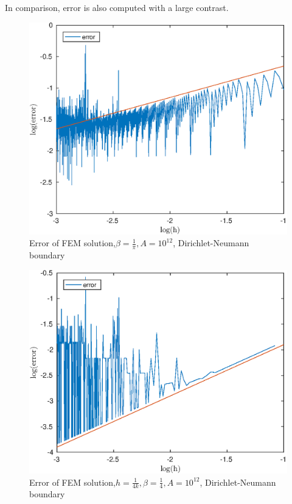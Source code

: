 \documentclass[12pt]{article}
\begin{document}
In comparison, error is also computed with a large contrast.
\begin{figure}[h!]
\centering
\includegraphics[scale=0.7]{error-pi-DN-12}
\caption{Error of FEM solution,$\beta=\frac{1}{\pi},A=10^{12}$, Dirichlet-Neumann boundary}
\label{fig-e-pi-DN}
\end{figure}
\pagebreak

\begin{figure}[h!]
\centering
\includegraphics[scale=0.7]{error-4-DN-12}
\caption{Error of FEM solution,$h=\frac{1}{4k},\beta=\frac{1}{4},A=10^{12}$, Dirichlet-Neumann boundary}
\label{fig-e-4-DN}
\end{figure}
\end{document}
